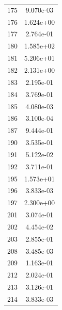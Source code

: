 \documentclass[12pt]{article}
\begin{document}
\begin{longtable}{@{}cc@{}}
175 & 9.070e-03 \\
176 & 1.624e+00 \\
177 & 2.764e-01 \\
180 & 1.585e+02 \\
181 & 5.206e+01 \\
182 & 2.131e+00 \\
183 & 2.195e-01 \\
184 & 3.769e-01 \\
185 & 4.080e-03 \\
186 & 3.100e-04 \\
187 & 9.444e-01 \\
190 & 3.535e-01 \\
191 & 5.122e-02 \\
192 & 3.711e-01 \\
195 & 1.573e+01 \\
196 & 3.833e-03 \\
197 & 2.300e+00 \\
201 & 3.074e-01 \\
202 & 4.454e-02 \\
203 & 2.855e-01 \\
208 & 3.485e-03 \\
209 & 1.163e-01 \\
212 & 2.024e-01 \\
213 & 3.126e-01 \\
214 & 3.833e-03 \\

\bottomrule
\end{longtable}
\end{document}
